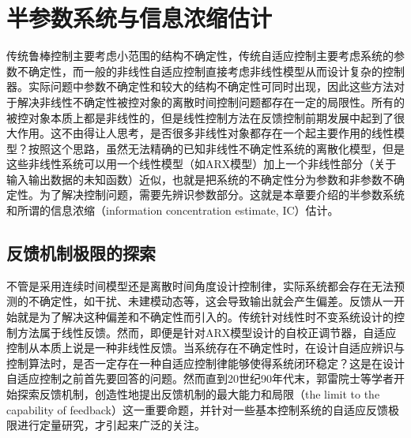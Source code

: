 \chapter{半参数系统与信息浓缩估计}\label{chap:2}
传统鲁棒控制主要考虑小范围的结构不确定性，传统自适应控制主要考虑系统的参数不确定性，而一般的非线性自适应控制直接考虑非线性模型从而设计复杂的控制器。实际问题中参数不确定性和较大的结构不确定性可同时出现，因此这些方法对于解决非线性不确定性被控对象的离散时间控制问题都存在一定的局限性。所有的被控对象本质上都是非线性的，但是线性控制方法在反馈控制前期发展中起到了很大作用。这不由得让人思考，是否很多非线性对象都存在一个起主要作用的线性模型？按照这个思路，虽然无法精确的已知非线性不确定性系统的离散化模型，但是这些非线性系统可以用一个线性模型（如ARX模型）加上一个非线性部分（关于输入输出数据的未知函数）近似，也就是把系统的不确定性分为参数和非参数不确定性。为了解决控制问题，需要先辨识参数部分。这就是本章要介绍的半参数系统和所谓的信息浓缩（information concentration estimate, IC）估计。

\section{反馈机制极限的探索}\label{sect:2.1}
不管是采用连续时间模型还是离散时间角度设计控制律，实际系统都会存在无法预测的不确定性，如干扰、未建模动态等，这会导致输出就会产生偏差。反馈从一开始就是为了解决这种偏差和不确定性而引入的。传统针对线性时不变系统设计的控制方法属于线性反馈。然而，即便是针对ARX模型设计的自校正调节器，自适应控制从本质上说是一种非线性反馈。当系统存在不确定性时，在设计自适应辨识与控制算法时，是否一定存在一种自适应控制律能够使得系统闭环稳定？这是在设计自适应控制之前首先要回答的问题。然而直到20世纪90年代末，郭雷院士等学者开始探索反馈机制，创造性地提出反馈机制的最大能力和局限（the limit to the capability of feedback）这一重要命题，并针对一些基本控制系统的自适应反馈极限进行定量研究，才引起来广泛的关注。

